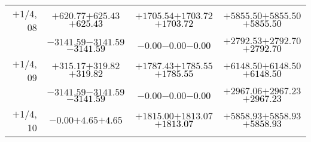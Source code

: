 \documentclass[compress]{beamer}
\begin{document}
\begin{frame}
{\begin{tabular}{r | c | c | c}
$+$1/4, 08 & $+620.77$\hspace{0.1 cm}$+625.43$\hspace{0.1 cm}\textcolor{black}{$+625.43$} & $+1705.54$\hspace{0.1 cm}$+1703.72$\hspace{0.1 cm}\textcolor{black}{$+1703.72$} & $+5855.50$\hspace{0.1 cm}$+5855.50$\hspace{0.1 cm}\textcolor{black}{$+5855.50$} \\
           & $-3141.59$\hspace{0.1 cm}$-3141.59$\hspace{0.1 cm}\textcolor{black}{$-3141.59$} & $-0.00$\hspace{0.1 cm}$-0.00$\hspace{0.1 cm}\textcolor{black}{$-0.00$} & $+2792.53$\hspace{0.1 cm}$+2792.70$\hspace{0.1 cm}\textcolor{black}{$+2792.70$} \\
$+$1/4, 09 & $+315.17$\hspace{0.1 cm}$+319.82$\hspace{0.1 cm}\textcolor{black}{$+319.82$} & $+1787.43$\hspace{0.1 cm}$+1785.55$\hspace{0.1 cm}\textcolor{black}{$+1785.55$} & $+6148.50$\hspace{0.1 cm}$+6148.50$\hspace{0.1 cm}\textcolor{black}{$+6148.50$} \\
           & $-3141.59$\hspace{0.1 cm}$-3141.59$\hspace{0.1 cm}\textcolor{black}{$-3141.59$} & $-0.00$\hspace{0.1 cm}$-0.00$\hspace{0.1 cm}\textcolor{black}{$-0.00$} & $+2967.06$\hspace{0.1 cm}$+2967.23$\hspace{0.1 cm}\textcolor{black}{$+2967.23$} \\
$+$1/4, 10 & $-0.00$\hspace{0.1 cm}$+4.65$\hspace{0.1 cm}\textcolor{black}{$+4.65$} & $+1815.00$\hspace{0.1 cm}$+1813.07$\hspace{0.1 cm}\textcolor{black}{$+1813.07$} & $+5858.93$\hspace{0.1 cm}$+5858.93$\hspace{0.1 cm}\textcolor{black}{$+5858.93$} \\

\end{tabular}}
\end{frame}
\end{document}
